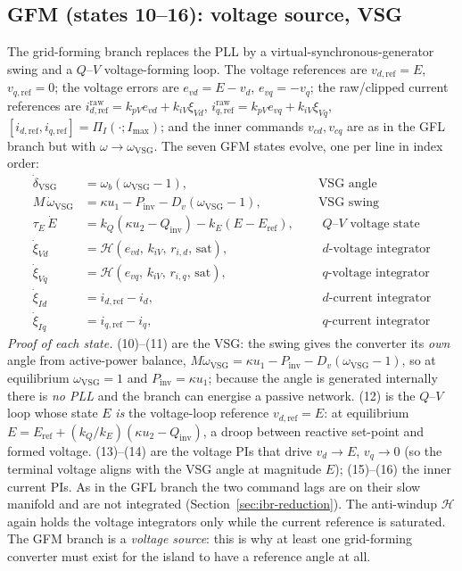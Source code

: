 \documentclass[12pt,a4paper]{article}
\theoremstyle{remark}
\begin{document}
\subsection{GFM (states 10--16): voltage source, VSG}
The grid-forming branch replaces the PLL by a virtual-synchronous-generator swing
and a $Q$--$V$ voltage-forming loop. The voltage references are
$v_{d,\mathrm{ref}}=E$, $v_{q,\mathrm{ref}}=0$; the voltage errors are
$e_{vd}=E-v_d$, $e_{vq}=-v_q$; the raw/clipped current references are
$i_{d,\mathrm{ref}}^{\mathrm{raw}}=k_{pV}e_{vd}+k_{iV}\xi_{Vd}$,
$i_{q,\mathrm{ref}}^{\mathrm{raw}}=k_{pV}e_{vq}+k_{iV}\xi_{Vq}$,
$[i_{d,\mathrm{ref}},i_{q,\mathrm{ref}}]=\Pi_I(\cdot;I_{\max})$; and the inner
commands $v_{cd},v_{cq}$ are as in the GFL branch but with $\omega\to\omega_{\mathrm{VSG}}$.
The seven GFM states evolve, one per line in index order:
\begin{align}
  \dot{\delta}_{\mathrm{VSG}} &= \omega_b(\omega_{\mathrm{VSG}}-1), &&\text{ VSG angle}\\
  M\,\dot{\omega}_{\mathrm{VSG}} &= \kappa u_1-P_{\mathrm{inv}}-D_v(\omega_{\mathrm{VSG}}-1),
     &&\text{ VSG swing}\\
  \tau_E\,\dot{E} &= k_Q(\kappa u_2-Q_{\mathrm{inv}})-k_E(E-E_{\mathrm{ref}}),
     &&\text{ $Q$--$V$ voltage state}\\
  \dot{\xi}_{Vd} &= \mathcal{H}(e_{vd},\,k_{iV},\,r_{i,d},\,\text{sat}),
     &&\text{ $d$-voltage integrator}\\
  \dot{\xi}_{Vq} &= \mathcal{H}(e_{vq},\,k_{iV},\,r_{i,q},\,\text{sat}),
     &&\text{ $q$-voltage integrator}\\
  \dot{\xi}_{Id} &= i_{d,\mathrm{ref}}-i_d, &&\text{ $d$-current integrator}\\
  \dot{\xi}_{Iq} &= i_{q,\mathrm{ref}}-i_q, &&\text{ $q$-current integrator}
\end{align}
\emph{Proof of each state.} (10)--(11) are the VSG: the swing gives the converter
its \emph{own} angle from active-power balance, $M\dot\omega_{\mathrm{VSG}}
=\kappa u_1-P_{\mathrm{inv}}-D_v(\omega_{\mathrm{VSG}}-1)$, so at equilibrium
$\omega_{\mathrm{VSG}}=1$ and $P_{\mathrm{inv}}=\kappa u_1$; because the angle is
generated internally there is \emph{no PLL} and the branch can energise a passive
network. (12) is the $Q$--$V$ loop whose state $E$ \emph{is} the voltage-loop
reference $v_{d,\mathrm{ref}}=E$: at equilibrium $E=E_{\mathrm{ref}}
+(k_Q/k_E)(\kappa u_2-Q_{\mathrm{inv}})$, a droop between reactive set-point and
formed voltage. (13)--(14) are the voltage PIs that drive $v_d\to E$, $v_q\to 0$
(so the terminal voltage aligns with the VSG angle at magnitude $E$); (15)--(16)
the inner current PIs. As in the GFL branch the two command lags are on their slow
manifold and are not integrated (Section~\ref{sec:ibr-reduction}). The
anti-windup $\mathcal H$ again holds the voltage integrators only while the
current reference is saturated. The GFM branch is a \emph{voltage source}: this is
why at least one grid-forming converter must exist for the island to have a
reference angle at all.
\end{document}
